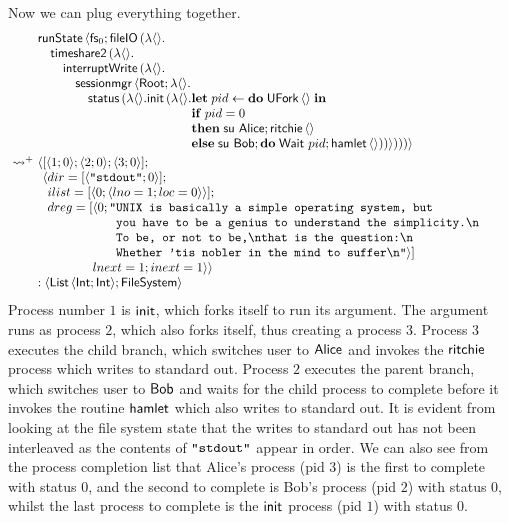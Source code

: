 \documentclass[12pt,phd,lfcs,twoside,openright,logo,leftchapter,normalheadings]{infthesis}
\theoremstyle{plain}
\theoremstyle{definition}
\begin{document}
Now we can plug everything together.
%
\[
  \ba{@{~}l@{~}l}
    &\bl
    \runState\,\Record{\dec{fs}_0;\fileIO\,(\lambda\Unit.\\
         \quad\timesharee\,(\lambda\Unit.\\
         \qquad\dec{interruptWrite}\,(\lambda\Unit.\\
         \qquad\quad\sessionmgr\,\Record{\Root;\lambda\Unit.\\
         \qquad\qquad\status\,(\lambda\Unit.
                       \init\,(\lambda\Unit.
                  \ba[t]{@{}l}
                  \Let\;pid \revto \Do\;\UFork\,\Unit\;\In\\
                  \If\;pid = 0\\
                  \Then\;\bl
                         \su~\Alice;
                         \quoteRitchie\,\Unit
                       \el\\
                  \Else\; \su~\Bob; \Do\;\Wait~pid; \quoteHamlet\,\Unit))})))}
                 \ea
     \el \smallskip\\
     \reducesto^+&
     \bl
      \Record{
       \ba[t]{@{}l}
       [\Record{1;0};\Record{2;0};\Record{3;0}];\\
       \Record{
         \ba[t]{@{}l}
           dir=[\Record{\strlit{stdout};0}];\\
           ilist=[\Record{0;\Record{lno=1;loc=0}}];\\
           dreg=[
             \ba[t]{@{}l}
               \Record{0;
                 \ba[t]{@{}l@{}l}
                   \texttt{"}&\texttt{UNIX is basically a simple operating system, but }\\
                             &\texttt{you have to be a genius to understand the simplicity.\nl}\\
                             &\texttt{To be, or not to be,\nl{}that is the question:\nl{}}\\
                             &\texttt{Whether 'tis nobler in the mind to suffer\nl{}"}}]
                 \ea\\
                lnext=1; inext=1}}\\
           \ea
         \ea
       \ea\\
       : \Record{\List\,\Record{\Int;\Int}; \FileSystem}
     \el
  \ea
\]
%
Process number $1$ is $\mathsf{init}$, which forks itself to run its
argument. The argument runs as process $2$, which also forks itself,
thus creating a process $3$. Process $3$ executes the child branch,
which switches user to $\mathsf{Alice}$ and invokes the $\mathsf{ritchie}$
process which writes to standard out. Process $2$ executes the parent
branch, which switches user to $\mathsf{Bob}$ and waits for the child process
to complete before it invokes the routine $\mathsf{hamlet}$ which also
writes to standard out.
%
It is evident from looking at the file system state that the writes to
standard out has not been interleaved as the contents of
$\texttt{"stdout"}$ appear in order. We can also see from the process
completion list that Alice's process (pid $3$) is the first to
complete with status $0$, and the second to complete is Bob's process
(pid $2$) with status $0$, whilst the last process to complete is the
$\mathsf{init}$ process (pid $1$) with status $0$.
\end{document}
